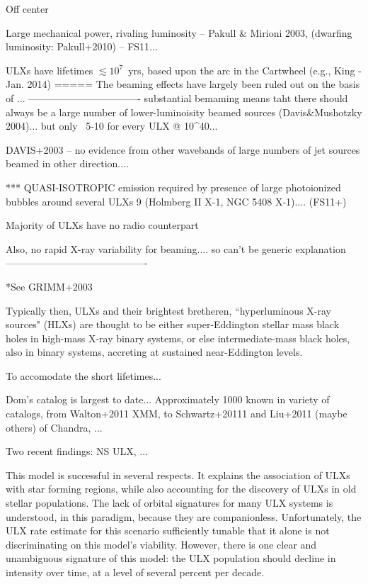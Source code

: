 Off center

Large mechanical power, rivaling luminosity -- Pakull & Mirioni 2003, (dwarfing luminosity: Pakull+2010) -- FS11...  

ULXs have lifetimes $\lesssim 10^7$~yrs, based upon the arc in the Cartwheel (e.g., King - Jan. 2014)
=====
The beaming effects have largely been ruled out on the basis of ...  
----------------------------------
substantial bemaming means taht there should always be a large number of lower-luminoisity beamed sources (Davis&Mushotzky 2004)... but only ~5-10 for every ULX @ 10^40...  

DAVIS+2003 -- no evidence from other wavebands of large numbers of jet sources beamed in other direction....  

*** QUASI-ISOTROPIC emission required by presence of large photoionized bubbles around several ULXs 9 (Holmberg II X-1, NGC 5408 X-1)....  (FS11+)

Majority of ULXs have no radio counterpart   

Also, no rapid X-ray variability for beaming.... so can't be generic explanation
-------------------------------------------


*See GRIMM+2003


Typically then, ULXs and their brightest bretheren, ``hyperluminous X-ray sources" (HLXs) are thought to be either super-Eddington stellar mass black holes in high-mass X-ray binary systems, or else intermediate-mass black holes, also in binary systems, accreting at sustained near-Eddington levels.    

To accomodate the short lifetimes... 


Dom's catalog is largest to date...   Approximately 1000 known in variety of catalogs, from Walton+2011 XMM, to Schwartz+20111 and Liu+2011 (maybe others) of Chandra, ...

Two recent findings:  NS ULX, ...








This model is successful in several respects. It explains the
association of ULXs with star forming regions, while also accounting
for the discovery of ULXs in old stellar populations.  The
lack of orbital signatures for many ULX systems is understood, in this
paradigm, because they are companionless.  Unfortunately, the ULX rate
estimate for this scenario sufficiently tunable that it alone is not
discriminating on this model's viability.  However, there is one clear
and unambiguous signature of this model: the ULX population should
decline in intensity over time, at a level of several percent per
decade.

